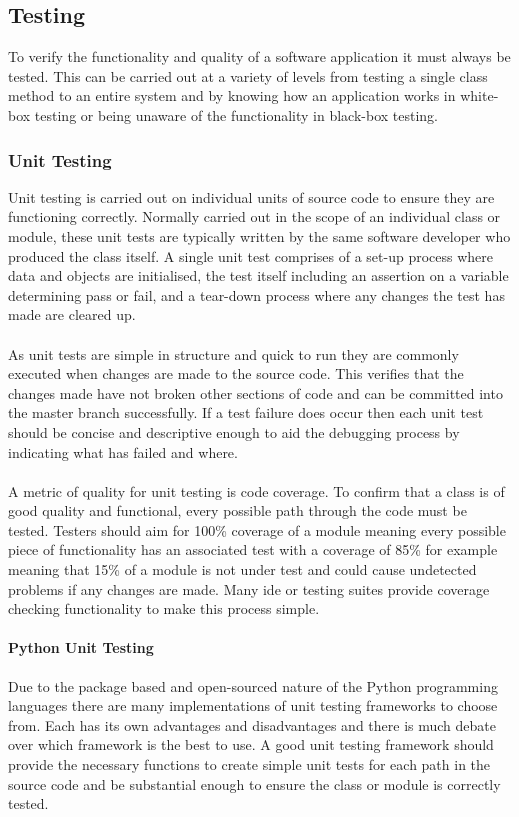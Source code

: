 \subsection{Testing}
	To verify the functionality and quality of a software application it must always be tested. This can be carried out at a variety of levels from testing a single class method to an entire system and by knowing how an application works in white-box testing or being unaware of the functionality in black-box testing.
	\subsubsection{Unit Testing}
		Unit testing is carried out on individual units of source code to ensure they are functioning correctly. Normally carried out in the scope of an individual class or module, these unit tests are typically written by the same software developer who produced the class itself. A single unit test comprises of a set-up process where data and objects are initialised, the test itself including an assertion on a variable determining pass or fail, and a tear-down process where any changes the test has made are cleared up.
		\\\\
		As unit tests are simple in structure and quick to run they are commonly executed when changes are made to the source code. This verifies that the changes made have not broken other sections of code and can be committed into the master branch successfully. If a test failure does occur then each unit test should be concise and descriptive enough to aid the debugging process by indicating what has failed and where.
		\\\\
		A metric of quality for unit testing is code coverage. To confirm that a class is of good quality and functional, every possible path through the code must be tested. Testers should aim for 100\% coverage of a module meaning every possible piece of functionality has an associated test with a coverage of 85\% for example meaning that 15\% of a module is not under test and could cause undetected problems if any changes are made. Many \gls{ide} or testing suites provide coverage checking functionality to make this process simple.
		\paragraph{Python Unit Testing}
			Due to the package based and open-sourced nature of the Python programming languages there are many implementations of unit testing frameworks to choose from. Each has its  own advantages and disadvantages and there is much  debate  over which framework is the best to use. A good unit testing framework should provide the necessary functions to create simple unit tests for each path in the source code and be substantial enough to ensure the class or module is correctly tested.
